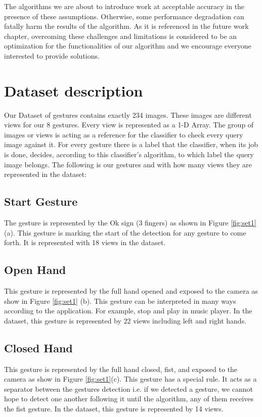 The algorithms we are about to introduce work at acceptable accuracy in the presence of these assumptions. Otherwise, some performance degradation can fatally harm the results of the algorithm. As it is referenced in the future work chapter, overcoming these challenges and limitations is considered to be an optimization for the functionalities of our algorithm and we encourage everyone interested to provide solutions. 
\bigskip


\section{Dataset description} 
Our Dataset of gestures contains exactly 234 images. These images are different views for our 8 gestures. Every view is represented as a 1-D Array. The group of images or views is acting as a reference for the classifier to check every query image against it. For every gesture there is a label that the classifier, when its job is done, decides, according to this classifier's algorithm, to which label the query image belongs. The following is our gestures and with how many views they are represented in the dataset:

\subsection{Start Gesture}
The gesture is represented by the Ok sign (3 fingers) as shown in Figure \ref{fig:set1} (a). This gesture is marking the start of the detection for any gesture to come forth. It is represented with 18 views in the dataset.

\subsection{Open Hand}
This gesture is represented by the full hand opened and exposed to the camera as show in Figure \ref{fig:set1} (b). This gesture can be interpreted in many ways according to the application. For example, stop and play in music player. In the dataset, this gesture is represented by 22 views including left and right hands.

\subsection{Closed Hand}
This gesture is represented by the full hand closed, fist, and exposed to the camera as show in Figure \ref{fig:set1}(c). This gesture has a special rule. It acts as a separator between the gestures detection i.e. if we detected a gesture, we cannot hope to detect one another following it until the algorithm, any of them receives the fist gesture. In the dataset, this gesture is represented by 14 views.

